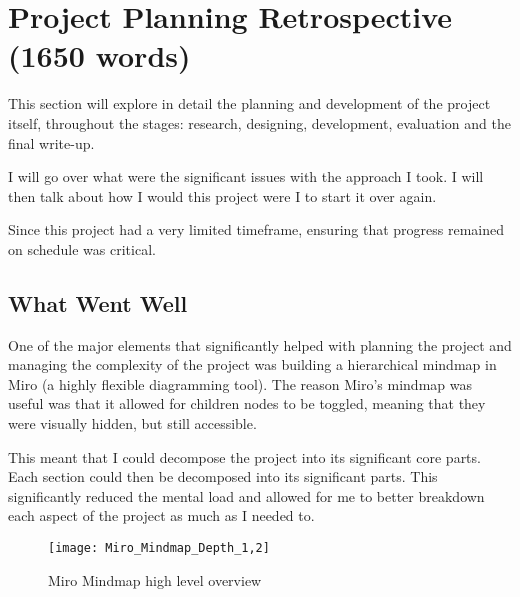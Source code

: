 \chapter{Project Planning Retrospective (1650 words)}
This section will explore in detail the planning and development of the project itself, throughout the stages: research, designing, development, evaluation and the final write-up.

I will go over what were the significant issues with the approach I took. I will then talk about how I would this project were I to start it over again.%

Since this project had a very limited timeframe, ensuring that progress remained on schedule was critical. %

\section{What Went Well}
One of the major elements that significantly helped with planning the project and managing the complexity of the project was building a hierarchical mindmap in Miro (a highly flexible diagramming tool). The reason Miro's mindmap was useful was that it allowed for children nodes to be toggled, meaning that they were visually hidden, but still accessible.

This meant that I could decompose the project into its significant core parts. Each section could then be decomposed into its significant parts. This significantly reduced the mental load and allowed for me to better breakdown each aspect of the project as much as I needed to.
\begin{figure}
    \texttt{[image: Miro\_Mindmap\_Depth\_1,2]}
    \caption{Miro Mindmap high level overview}
\end{figure}


